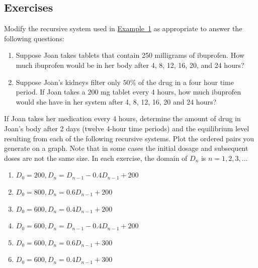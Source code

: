 \documentclass[10pt,]{book}
\theoremstyle{ptxdefinitionnotitle}
\theoremstyle{ptxdefinitiontitle}
\theoremstyle{ptxdefinitionnotitle}
\theoremstyle{ptxdefinitiontitle}
\theoremstyle{ptxdefinitionnotitle}
\theoremstyle{ptxdefinitiontitle}
\numberwithin{equation}{section}
\begin{document}
\subsection[{Exercises}]{Exercises}\label{exercises-2}
\begin{divisionexercise}{1}\hypertarget{exercise-3}{}
\hypertarget{p-21}{}%
Modify the recursive  system  used in \hyperref[ibuprofen-example-one-dose]{Example~1} as appropriate to answer the following questions: \leavevmode%
\begin{enumerate}[label=(\alph*)]
\item\hypertarget{li-7}{}Suppose Joan takes tablets that contain 250 milligrams of ibuprofen.  How much ibuprofen would be in her body after 4, 8, 12, 16, 20, and 24 hours?%
\item\hypertarget{li-8}{}Suppose Joan’s kidneys filter only \(50\%\) of the drug in a four hour time period.  If Joan takes a 200 mg tablet every 4 hours, how much ibuprofen would she  have in her system after  4, 8, 12, 16, 20 and 24 hours?%
\end{enumerate}
%
\end{divisionexercise}%
\begin{divisionexercise}{2}\hypertarget{exercise-4}{}
\hypertarget{p-22}{}%
If Joan takes her medication every 4 hours, determine the amount of drug in Joan’s body after 2 days (twelve  4-hour time periods) and the equilibrium level resulting from each of the following recursive systems.  Plot the ordered pairs you generate on a graph.  Note that in some cases the initial dosage and subsequent doses are not the same size.  In each exercise, the domain of \(D_n\) is \(n=1,2,3, ...\) \leavevmode%
\begin{enumerate}[label=(\alph*)]
\item\hypertarget{li-9}{}\(D_0=200, D_n=D_{n-1} - 0.4D_{n-1} + 200\)%
\item\hypertarget{li-10}{}\(D_0=800, D_n=0.6D_{n-1} + 200\)%
\item\hypertarget{li-11}{}\(D_0=600, D_n=0.4D_{n-1} + 200\)%
\item\hypertarget{li-12}{}\(D_0=600, D_n=D_{n-1} - 0.4D_{n-1} + 200\)%
\item\hypertarget{li-13}{}\(D_0=600, D_n=0.6D_{n-1} + 300\)%
\item\hypertarget{li-14}{}\(D_0=600, D_n=0.4D_{n-1} + 300\)%
\end{enumerate}
%
\end{divisionexercise}%
\end{document}

